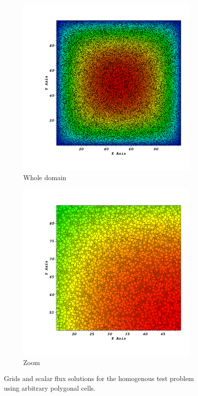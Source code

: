 \documentclass[preprint,10pt]{elsarticle}
\renewcommand{\(}{\left(}
\renewcommand{\)}{\right)}
\renewcommand{\[}{\left[}
\renewcommand{\]}{\right]}
\begin{document}
\begin{figure}[!htbp]
  \centering
  \begin{subfigure}{0.45\textwidth}
    \centering
    \includegraphics[width=\textwidth]{poly_solu0000}
    \caption{Whole domain}
  \end{subfigure}
  \begin{subfigure}{0.45\textwidth}
    \centering
    \includegraphics[width=\textwidth]{poly_solu0001}
    \caption{Zoom}
  \end{subfigure}
  \caption{Grids and scalar flux solutions for the homogenous test problem  using arbitrary polygonal cells.}
  \label{homog_test_polys}
\end{figure}
\end{document}
